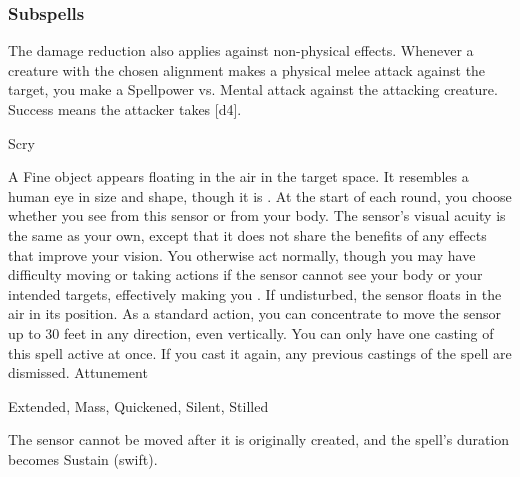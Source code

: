\subsubsection{Subspells}
The damage reduction also applies against non-physical effects.
Whenever a creature with the chosen alignment makes a physical melee attack against the target, you make a Spellpower vs. Mental attack against the attacking creature.
Success means the attacker takes [d4].
\begin{spellsection}{Scry}
\begin{spellheader}
\end{spellheader}
\begin{spellcontent}
\begin{spelltargetinginfo}
\end{spelltargetinginfo}
\begin{spelleffects}
\spelleffect
A Fine object appears floating in the air in the target space.
It resembles a human eye in size and shape, though it is .
At the start of each round, you choose whether you see from this sensor or from your body.
The sensor's visual acuity is the same as your own, except that it does not share the benefits of any  effects that improve your vision.
You otherwise act normally, though you may have difficulty moving or taking actions if the sensor cannot see your body or your intended targets, effectively making you \blinded.
If undisturbed, the sensor floats in the air in its position.
As a standard action, you can concentrate to move the sensor up to 30 feet in any direction, even vertically.
You can only have one casting of this spell active at once.
If you cast it again, any previous castings of the spell are dismissed.
\spelldur Attunement
\end{spelleffects}
\end{spellcontent}
\begin{spellfooter}
 Extended, Mass, Quickened, Silent, Stilled
\end{spellfooter}
\begin{spellsubcontent}
\begin{spellcantrip}
The sensor cannot be moved after it is originally created, and the spell's duration becomes Sustain (swift).
\end{spellcantrip}
\end{spellsubcontent}
\end{spellsection}
